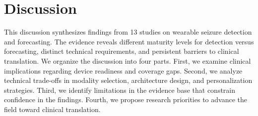 
\section{Discussion}
\label{sec:discussion}

This discussion synthesizes findings from 13 studies on wearable seizure detection and forecasting. The evidence reveals different maturity levels for detection versus forecasting, distinct technical requirements, and persistent barriers to clinical translation. We organize the discussion into four parts. First, we examine clinical implications regarding device readiness and coverage gaps. Second, we analyze technical trade-offs in modality selection, architecture design, and personalization strategies. Third, we identify limitations in the evidence base that constrain confidence in the findings. Fourth, we propose research priorities to advance the field toward clinical translation.





